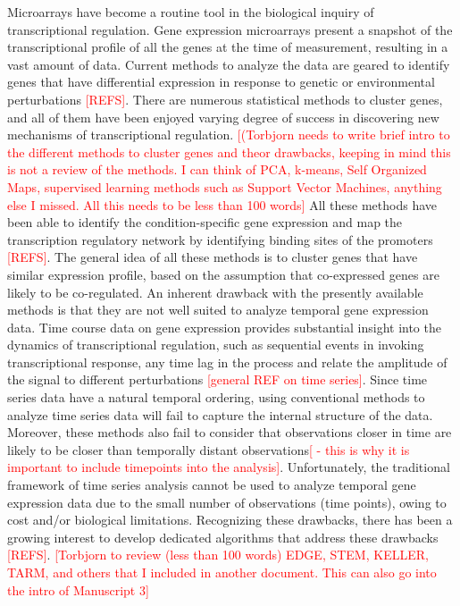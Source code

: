 \documentclass{bioinfo}
\begin{document}
Microarrays have become a routine tool in the biological inquiry of
transcriptional regulation. Gene expression microarrays present a
snapshot of the transcriptional profile of all the genes at the time
of measurement, resulting in a vast amount of data. Current methods to
analyze the data are geared to identify genes that have differential
expression in response to genetic or environmental perturbations
\textcolor{red}{[REFS]}. There are numerous statistical methods to
cluster genes, and all of them have been enjoyed varying degree of
success in discovering new mechanisms of transcriptional
regulation. \textcolor{red}{[(Torbjorn needs to write brief intro to
  the different methods to cluster genes and theor drawbacks, keeping
  in mind this is not a review of the methods. I can think of PCA,
  k-means, Self Organized Maps, supervised learning methods such as
  Support Vector Machines, anything else I missed. All this needs to
  be less than 100 words]}  All these methods have been able to
identify the condition-specific gene expression and map the
transcription regulatory network by identifying binding sites of the
promoters \textcolor{red}{[REFS]}. The general idea of all these
methods is to cluster genes that have similar expression profile,
based on the assumption that co-expressed genes are likely to be
co-regulated. 
An inherent drawback with the presently available methods is that they
are not well suited to analyze temporal gene expression data. Time
course data on gene expression provides substantial insight into the
dynamics of transcriptional regulation, such as sequential events in
invoking transcriptional response, any time lag in the process and
relate the amplitude of the signal to different perturbations
\textcolor{red}{[general REF on time series]}. Since time series data
have a natural temporal ordering, using conventional methods to
analyze time series data will fail to capture the internal structure
of the data. Moreover, these methods also fail to consider that
observations closer in time are likely to be closer than temporally
distant observations\textcolor{red}{[ - this is why it is important to
  include timepoints into the analysis]}. Unfortunately, the
traditional framework of time series analysis cannot be used to
analyze temporal gene expression data due to the small number of
observations (time points), owing to cost and/or biological
limitations. Recognizing these drawbacks, there has been a growing
interest to develop dedicated algorithms that address these drawbacks
\textcolor{red}{[REFS]}.  
\textcolor{red}{[Torbjorn to review (less than 100 words) EDGE, STEM,
  KELLER, TARM, and others that I included in another document. This
  can also go into the intro of Manuscript 3]} 
\end{document}
